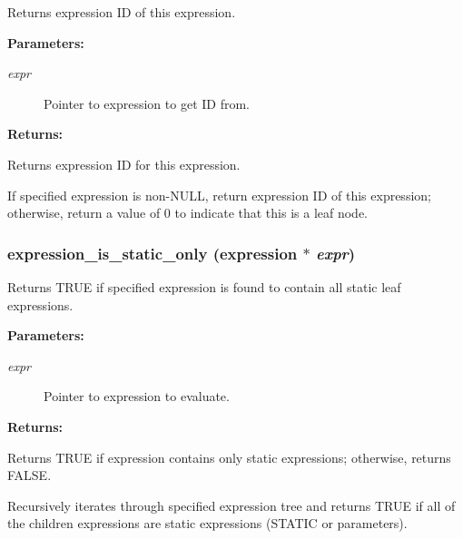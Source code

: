 Returns expression ID of this expression.

\begin{Desc}
\item[{\bf Parameters: }]\par
\begin{description}
\item[
{\em expr}]Pointer to expression to get ID from. \end{description}
\end{Desc}
\begin{Desc}
\item[{\bf Returns: }]\par
Returns expression ID for this expression.

\end{Desc}
If specified expression is non-NULL, return expression ID of this expression; otherwise, return a value of 0 to indicate that this is a leaf node. 
\subsubsection{ expression\_\-is\_\-static\_\-only ({\bf expression} $\ast$ {\em expr})}\label{expr_8h_a12}


Returns TRUE if specified expression is found to contain all static leaf expressions.

\begin{Desc}
\item[{\bf Parameters: }]\par
\begin{description}
\item[
{\em expr}]Pointer to expression to evaluate.

\end{description}
\end{Desc}
\begin{Desc}
\item[{\bf Returns: }]\par
Returns TRUE if expression contains only static expressions; otherwise, returns FALSE.

\end{Desc}
Recursively iterates through specified expression tree and returns TRUE if all of the children expressions are static expressions (STATIC or parameters). 
